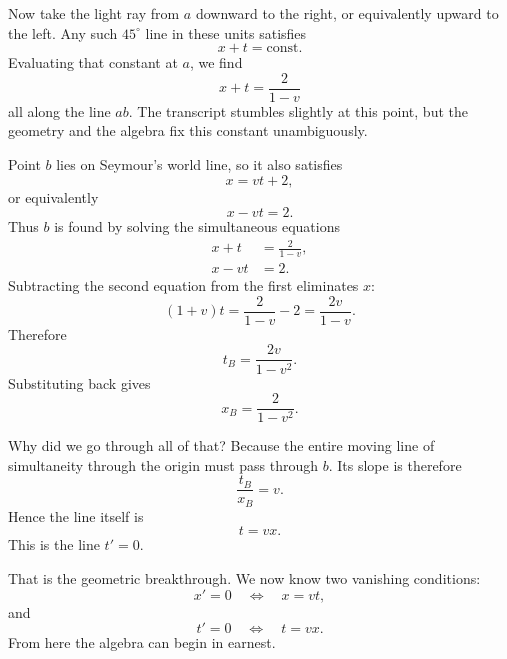 Now take the light ray from \(a\) downward to the right, or equivalently upward to the left. Any such \(45^\circ\) line in these units satisfies
\begin{equation}
x+t=\text{const}.
\end{equation}
Evaluating that constant at \(a\), we find
\begin{equation}
x+t=\frac{2}{1-v}
\end{equation}
all along the line \(ab\). The transcript stumbles slightly at this point, but the geometry and the algebra fix this constant unambiguously.

Point \(b\) lies on Seymour's world line, so it also satisfies
\begin{equation}
x=vt+2,
\end{equation}
or equivalently
\begin{equation}
x-vt=2.
\end{equation}
Thus \(b\) is found by solving the simultaneous equations
\begin{align}
x+t &= \frac{2}{1-v}, \\
x-vt &= 2.
\end{align}
Subtracting the second equation from the first eliminates \(x\):
\begin{equation}
(1+v)t=\frac{2}{1-v}-2=\frac{2v}{1-v}.
\end{equation}
Therefore
\begin{equation}
t_B=\frac{2v}{1-v^2}.
\end{equation}
Substituting back gives
\begin{equation}
x_B=\frac{2}{1-v^2}.
\end{equation}

Why did we go through all of that? Because the entire moving line of simultaneity through the origin must pass through \(b\). Its slope is therefore
\begin{equation}
\frac{t_B}{x_B}=v.
\end{equation}
Hence the line itself is
\begin{equation}
t=vx.
\end{equation}
This is the line \(t'=0\).

That is the geometric breakthrough. We now know two vanishing conditions:
\begin{equation}
x'=0 \quad \Longleftrightarrow \quad x=vt,
\end{equation}
and
\begin{equation}
t'=0 \quad \Longleftrightarrow \quad t=vx.
\end{equation}
From here the algebra can begin in earnest.

